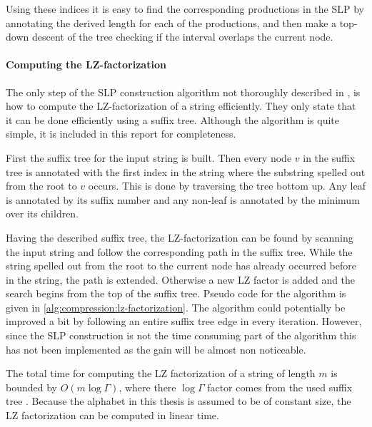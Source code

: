 \documentclass[twoside,11pt,openright]{report}
\begin{document}
Using these indices it is easy to find the corresponding productions in the SLP by annotating the derived length for each of the productions, and then make a top-down descent of the tree checking if the interval overlaps the current node.

\paragraph{Computing the LZ-factorization}
The only step of the SLP construction algorithm not thoroughly described in \cite{Rytter2003211}, is how to compute the LZ-factorization of a string efficiently. They only state that it can be done efficiently using a suffix tree. Although the algorithm is quite simple, it is included in this report for completeness.

First the suffix tree for the input string is built. Then every node $v$ in the suffix tree is annotated with the first index in the string where the substring spelled out from the root to $v$ occurs. This is done by traversing the tree bottom up. Any leaf is annotated by its suffix number and any non-leaf is annotated by the minimum over its children.

Having the described suffix tree, the LZ-factorization can be found by scanning the input string and follow the corresponding path in the suffix tree. While the string spelled out from the root to the current node has already occurred before in the string, the path is extended. Otherwise a new LZ factor is added and the search begins from the top of the suffix tree. Pseudo code for the algorithm is given in \cref{alg:compression:lz-factorization}. The algorithm could potentially be improved a bit by following an entire suffix tree edge in every iteration. However, since the SLP construction is not the time consuming part of the algorithm this has not been implemented as the gain will be almost non noticeable.

The total time for computing the LZ factorization of a string of length $m$ is bounded by $O(m\log{\Gamma})$, where there $\log{\Gamma}$ factor comes from the used suffix tree \cite{SDSL}. Because the alphabet in this thesis is assumed to be of constant size, the LZ factorization can be computed in linear time.
\end{document}

